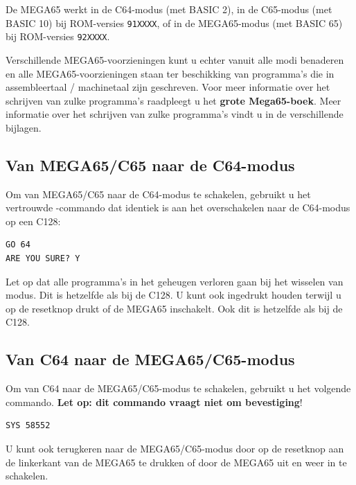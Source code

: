 De MEGA65 werkt in de C64-modus (met BASIC 2), in de C65-modus (met BASIC 10) bij ROM-versies {\tt 91XXXX}, of in de MEGA65-modus (met BASIC 65) bij ROM-versies {\tt 92XXXX}.

Verschillende MEGA65-voorzieningen kunt u echter vanuit alle modi benaderen en alle MEGA65-voorzieningen staan ter beschikking van programma's die in assembleertaal / machinetaal zijn geschreven.
\ifdefined\printmanual
Voor meer informatie over het schrijven van zulke programma's raadpleegt u het {\bf grote Mega65-boek}.
\else
Meer informatie over het schrijven van zulke programma's vindt u in de verschillende bijlagen.
\fi

\subsection{Van MEGA65/C65 naar de C64-modus}

Om van MEGA65/C65 naar de C64-modus te schakelen, gebruikt u het vertrouwde -commando dat identiek is aan het overschakelen naar de C64-modus op een C128:
\begin{tcolorbox}[colback=black,coltext=white]
\verbatimfont{\codefont}
\begin{verbatim}
GO 64
ARE YOU SURE? Y
\end{verbatim}
\end{tcolorbox}

Let op dat alle programma's in het geheugen verloren gaan bij het wisselen van modus. Dit is hetzelfde als bij de C128.
U kunt ook \megasymbolkey ingedrukt houden terwijl u op de resetknop drukt of de MEGA65 inschakelt. Ook dit is hetzelfde als bij de C128.

\subsection{Van C64 naar de MEGA65/C65-modus}

Om van C64 naar de MEGA65/C65-modus te schakelen, gebruikt u het volgende commando. {\bf Let op: dit commando vraagt niet om bevestiging}!

\begin{tcolorbox}[colback=black,coltext=white]
\verbatimfont{\codefont}
\begin{verbatim}
SYS 58552
\end{verbatim}
\end{tcolorbox}

U kunt ook terugkeren naar de MEGA65/C65-modus door op de resetknop aan de linkerkant van de MEGA65 te drukken of door de MEGA65 uit en weer in te schakelen.

